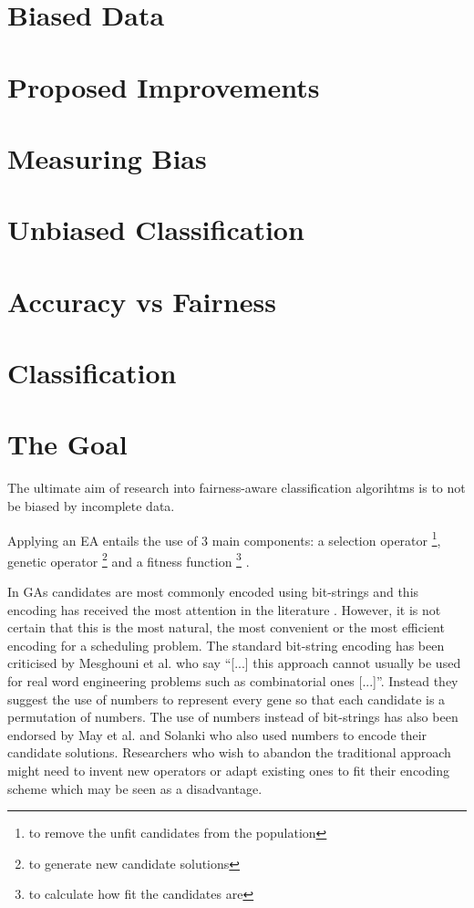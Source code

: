 \documentclass[a4paper, 12pt, titlepage]{article}
\begin{document}
\section*{Biased Data}

\section*{Proposed Improvements}

\section*{Measuring Bias}

\section*{Unbiased Classification}

\section*{Accuracy vs Fairness}

\section*{Classification}

\section*{The Goal}

The ultimate aim of research into fairness-aware classification algorihtms is to not be biased by incomplete data.

Applying an EA entails the use of 3 main components: a selection operator \footnote{to remove the unfit candidates from the population}, genetic operator \footnote{to generate new candidate solutions} and a fitness function \footnote{to calculate how fit the candidates are} \cite{mesghouni2004, yu2002, diveev2017, aljarrah2017, timilsina2015}.  

In GAs candidates are most commonly encoded using bit-strings \cite[p.~127]{norvig2010} and this encoding has received the most attention in the literature \cite[p.~103]{eberhart2007}.  However, it is not certain that this is the most natural, the most convenient or the most efficient encoding for a scheduling problem.  The standard bit-string encoding has been criticised by Mesghouni et al.  who say ``[...] this approach cannot usually be used for real word engineering problems such as combinatorial ones [...]''\cite[p.~93]{mesghouni2004}. Instead they suggest the use of numbers to represent every gene so that each candidate is a permutation of numbers.  The use of numbers instead of bit-strings has also been endorsed by May et al.  and Solanki who also used numbers to encode their candidate solutions. \cite[p.~7076]{may2015} \cite[p.~3868]{solanki2015} Researchers who wish to abandon the traditional approach might need to invent new operators or adapt existing ones to fit their encoding scheme which may be seen as a disadvantage.
\end{document}
